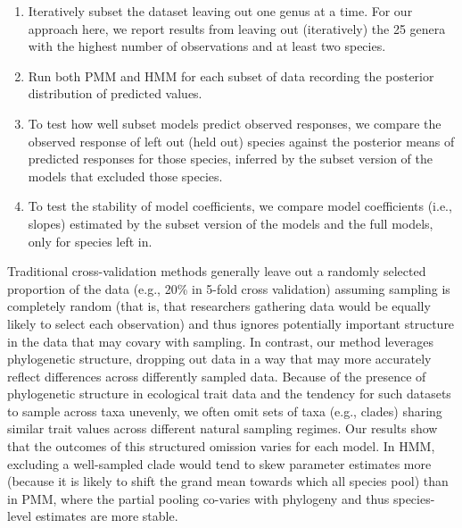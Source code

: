 \documentclass[11pt]{article}
\begin{document}
\begin{enumerate}
\item Iteratively subset the dataset leaving out one genus at a time. For our approach here, we report results from leaving out (iteratively) the 25 genera with the highest number of observations and at least two species. 
\item Run both PMM and HMM for each subset of data recording the posterior distribution of predicted values. 
\item To test how well subset models predict observed responses, we compare the observed response of left out (held out) species against the posterior means of predicted responses for those species, inferred by the subset version of the models that excluded those species. %
\item To test the stability of model coefficients, we compare model coefficients (i.e., slopes) estimated by the subset version of the models and the full models, only for species left in.
\end{enumerate} %

Traditional cross-validation methods generally leave out a randomly selected proportion of the data (e.g., 20\% in 5-fold cross validation) assuming sampling is completely random (that is, that researchers gathering data would be equally likely to select each observation) and thus ignores potentially important structure in the data that may covary with sampling. In contrast, our method leverages phylogenetic structure, dropping out data in a way that may more accurately reflect differences across differently sampled data. Because of the presence of phylogenetic structure in ecological trait data and the tendency for such datasets to sample across taxa unevenly, we often omit sets of taxa (e.g., clades) sharing similar trait values across different natural sampling regimes. Our results show that the outcomes of this structured omission varies for each model. In HMM, excluding a well-sampled clade would tend to skew parameter estimates more (because it is likely to shift the grand mean towards which all species pool) than in PMM, where the partial pooling co-varies with phylogeny and thus species-level estimates are more stable. 
\end{document}
